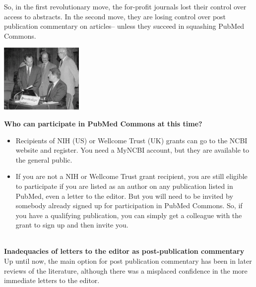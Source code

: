 \documentclass[11pt,twoside,a4paper]{article}
\begin{document}
\begin{minipage}[h]{13.75cm}
	So, in the first revolutionary move, the for-profit journals lost their control over access to abstracts. In the second move, they are losing control over post publication commentary on articles– unless they succeed in squashing PubMed Commons. ~\\
\end{minipage} \hfill \begin{minipage}[h]{5.25cm}
	\hfill \includegraphics[width=4.00cm]{img/al-gore-pubmed-300x248.png}
\end{minipage}

\textbf{\large Who can participate in PubMed Commons at this time?}
\begin{itemize}
	\item Recipients of NIH (US) or Wellcome Trust (UK) grants can go to the NCBI website and register. You need a MyNCBI account, but they are available to the general public.
	\item If you are not a NIH or Wellcome Trust grant recipient, you are still eligible to participate if you are listed as an author on any publication listed in PubMed, even a letter to the editor. But you will need to be invited by somebody already signed up for participation in PubMed Commons. So, if you have a qualifying publication, you can simply get a colleague with the grant to sign up and then invite you.
\end{itemize} ~\\

\textbf{\large Inadequacies of letters to the editor as post-publication commentary~}~\\

Up until now, the main option for post publication commentary has been in later reviews of the literature, although there was a misplaced confidence in the more immediate letters to the editor. ~\\
\end{document}
